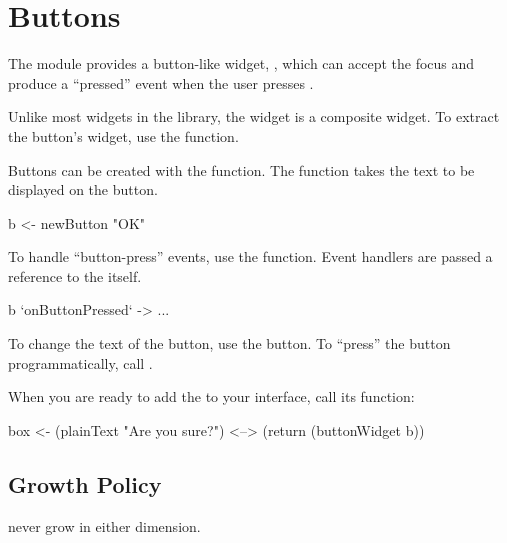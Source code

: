 \section{Buttons}

The  module provides a button-like widget, ,
which can accept the focus and produce a ``pressed'' event when the
user presses .

Unlike most widgets in the library, the  widget is a
composite widget.  To extract the button's widget, use the
 function.

Buttons can be created with the  function.  The function
takes the text to be displayed on the button.

\begin{haskellcode}
 b <- newButton "OK"
\end{haskellcode}

To handle ``button-press'' events, use the 
function.  Event handlers are passed a reference to the 
itself.

\begin{haskellcode}
 b `onButtonPressed` \this ->
   ...
\end{haskellcode}

To change the text of the button, use the  button.
To ``press'' the button programmatically, call .

When you are ready to add the  to your interface, call its
 function:

\begin{haskellcode}
 box <- (plainText "Are you sure?") <--> (return (buttonWidget b))
\end{haskellcode}

\subsection{Growth Policy}

 never grow in either dimension.
